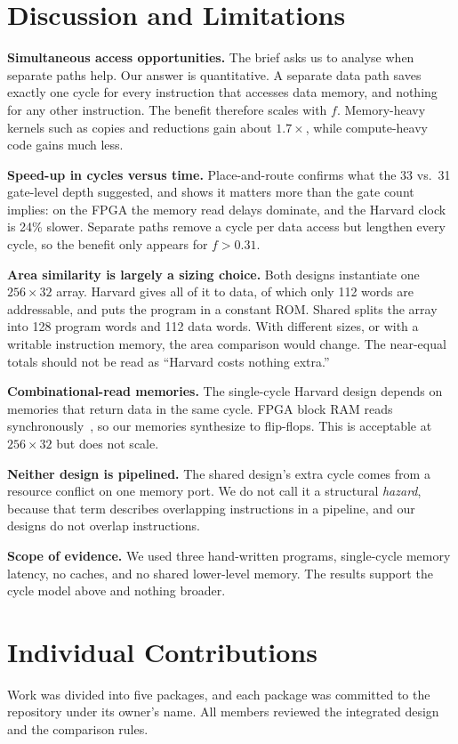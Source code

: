\documentclass[conference]{IEEEtran}
\begin{document}
\section{Discussion and Limitations}\label{sec:discussion}
\textbf{Simultaneous access opportunities.} The brief asks us to analyse when separate paths help. Our answer is quantitative. A separate data path saves exactly one cycle for every instruction that accesses data memory, and nothing for any other instruction. The benefit therefore scales with $f$. Memory-heavy kernels such as copies and reductions gain about $1.7\times$, while compute-heavy code gains much less.

\textbf{Speed-up in cycles versus time.} Place-and-route confirms what the 33 vs.\ 31 gate-level depth suggested, and shows it matters more than the gate count implies: on the FPGA the memory read delays dominate, and the Harvard clock is 24\% slower. Separate paths remove a cycle per data access but lengthen every cycle, so the benefit only appears for $f>0.31$.

\textbf{Area similarity is largely a sizing choice.} Both designs instantiate one $256\times32$ array. Harvard gives all of it to data, of which only 112 words are addressable, and puts the program in a constant ROM. Shared splits the array into 128 program words and 112 data words. With different sizes, or with a writable instruction memory, the area comparison would change. The near-equal totals should not be read as ``Harvard costs nothing extra.''

\textbf{Combinational-read memories.} The single-cycle Harvard design depends on memories that return data in the same cycle. FPGA block RAM reads synchronously~\cite{ug473}, so our memories synthesize to flip-flops. This is acceptable at $256\times32$ but does not scale.

\textbf{Neither design is pipelined.} The shared design's extra cycle comes from a resource conflict on one memory port. We do not call it a structural \emph{hazard}, because that term describes overlapping instructions in a pipeline, and our designs do not overlap instructions.

\textbf{Scope of evidence.} We used three hand-written programs, single-cycle memory latency, no caches, and no shared lower-level memory. The results support the cycle model above and nothing broader.

\section{Individual Contributions}\label{sec:contrib}
Work was divided into five packages, and each package was committed to the repository under its owner's name. All members reviewed the integrated design and the comparison rules.
\end{document}
